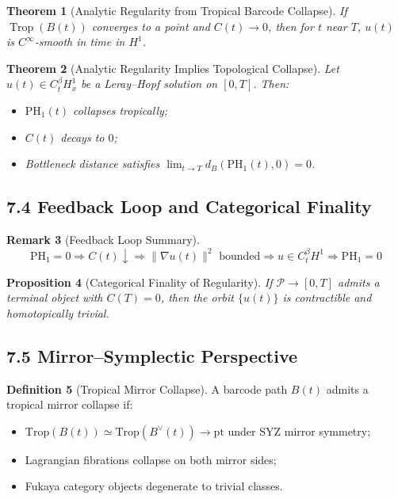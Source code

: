 \documentclass[11pt]{article}
\newtheorem{theorem}{Theorem}[section]
\newtheorem{proposition}[theorem]{Proposition}
\theoremstyle{definition}
\newtheorem{definition}[theorem]{Definition}
\newtheorem{remark}[theorem]{Remark}
\begin{document}
\begin{theorem}[Analytic Regularity from Tropical Barcode Collapse]
If $\operatorname{Trop}(B(t))$ converges to a point and $C(t) \to 0$, then for $t$ near $T$, $u(t)$ is $C^\infty$-smooth in time in $H^1$.
\end{theorem}

\begin{theorem}[Analytic Regularity Implies Topological Collapse]
Let $u(t) \in C^\beta_t H^1_x$ be a Leray--Hopf solution on $[0, T]$. Then:
\begin{itemize}
  \item $\mathrm{PH}_1(t)$ collapses tropically;
  \item $C(t)$ decays to $0$;
  \item Bottleneck distance satisfies $\lim_{t \to T} d_B(\mathrm{PH}_1(t), 0) = 0$.
\end{itemize}
\end{theorem}

\subsection*{7.4 Feedback Loop and Categorical Finality}

\begin{remark}[Feedback Loop Summary]
\[
\text{PH}_1 = 0 \Longrightarrow C(t)\downarrow \Longrightarrow \|\nabla u(t)\|^2\text{ bounded} \Longrightarrow u \in C_t^\beta H^1 \Longrightarrow \text{PH}_1 = 0
\]
\end{remark}

\begin{proposition}[Categorical Finality of Regularity]
If $\mathcal{P} \to [0,T]$ admits a terminal object with $C(T) = 0$, then the orbit $\{ u(t) \}$ is contractible and homotopically trivial.
\end{proposition}

\subsection*{7.5 Mirror--Symplectic Perspective}

\begin{definition}[Tropical Mirror Collapse]
A barcode path $B(t)$ admits a tropical mirror collapse if:
\begin{itemize}
  \item $\mathrm{Trop}(B(t)) \simeq \mathrm{Trop}(B^\vee(t)) \to \mathrm{pt}$ under SYZ mirror symmetry;
  \item Lagrangian fibrations collapse on both mirror sides;
  \item Fukaya category objects degenerate to trivial classes.
\end{itemize}
\end{definition}
\end{document}
